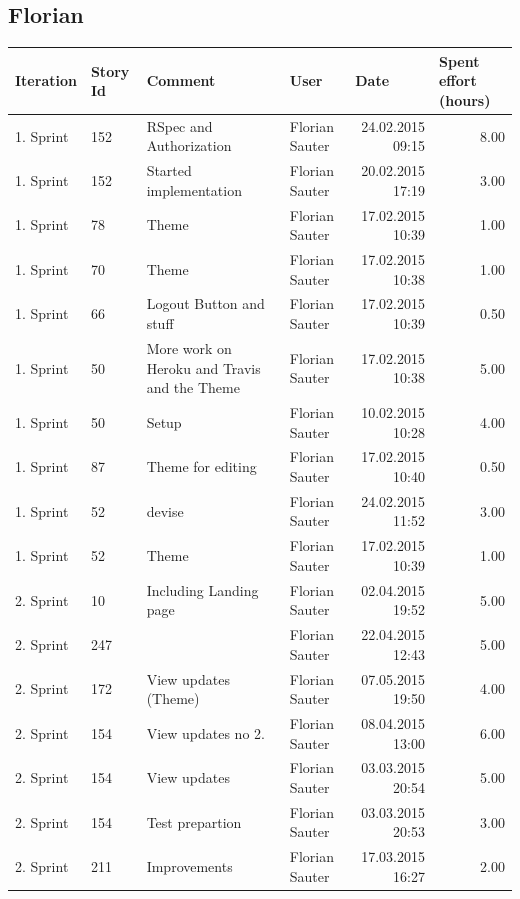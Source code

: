 \documentclass[a4paper]{article}
\begin{document}
\begin{landscape}
\subsection{Florian}
\begin{tabular}{|l|l|l|l|r|r|}
\hline
\textbf{Iteration} & \textbf{Story Id} & \textbf{Comment} & \textbf{User} & \multicolumn{1}{l|}{\textbf{Date}} & \multicolumn{1}{l|}{\textbf{Spent effort (hours)}} \\ \hline
1. Sprint & 152 & RSpec and Authorization & Florian Sauter & 24.02.2015 09:15 & 8.00 \\ \hline
1. Sprint & 152 & Started implementation & Florian Sauter & 20.02.2015 17:19 & 3.00 \\ \hline
1. Sprint & 78 & Theme & Florian Sauter & 17.02.2015 10:39 & 1.00 \\ \hline
1. Sprint & 70 & Theme & Florian Sauter & 17.02.2015 10:38 & 1.00 \\ \hline
1. Sprint & 66 & Logout Button and stuff & Florian Sauter & 17.02.2015 10:39 & 0.50 \\ \hline
1. Sprint & 50 & More work on Heroku and Travis and the Theme & Florian Sauter & 17.02.2015 10:38 & 5.00 \\ \hline
1. Sprint & 50 & Setup & Florian Sauter & 10.02.2015 10:28 & 4.00 \\ \hline
1. Sprint & 87 & Theme for editing & Florian Sauter & 17.02.2015 10:40 & 0.50 \\ \hline
1. Sprint & 52 & devise & Florian Sauter & 24.02.2015 11:52 & 3.00 \\ \hline
1. Sprint & 52 & Theme & Florian Sauter & 17.02.2015 10:39 & 1.00 \\ \hline
2. Sprint & 10 & Including Landing page & Florian Sauter & 02.04.2015 19:52 & 5.00 \\ \hline
2. Sprint & 247 &  & Florian Sauter & 22.04.2015 12:43 & 5.00 \\ \hline
2. Sprint & 172 & View updates (Theme) & Florian Sauter & 07.05.2015 19:50 & 4.00 \\ \hline
2. Sprint & 154 & View updates no 2. & Florian Sauter & 08.04.2015 13:00 & 6.00 \\ \hline
2. Sprint & 154 & View updates & Florian Sauter & 03.03.2015 20:54 & 5.00 \\ \hline
2. Sprint & 154 & Test prepartion & Florian Sauter & 03.03.2015 20:53 & 3.00 \\ \hline
2. Sprint & 211 & Improvements & Florian Sauter & 17.03.2015 16:27 & 2.00 \\ \hline

\end{tabular}
\end{landscape}
\end{document}

